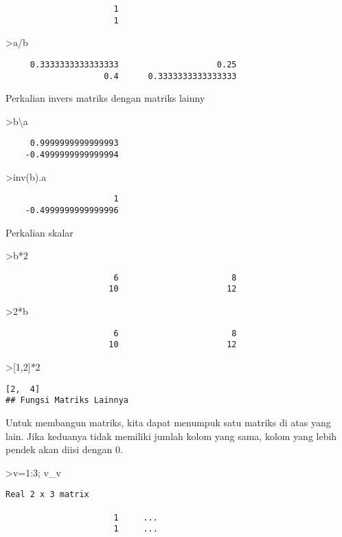 \documentclass[
]{book}
\begin{document}
\begin{verbatim}
                      1 
                      1 
\end{verbatim}

\textgreater a/b

\begin{verbatim}
     0.3333333333333333                    0.25 
                    0.4      0.3333333333333333 
\end{verbatim}

Perkalian invers matriks dengan matriks lainny

\textgreater b\textbackslash a

\begin{verbatim}
     0.9999999999999993 
    -0.4999999999999994 
\end{verbatim}

\textgreater inv(b).a

\begin{verbatim}
                      1 
    -0.4999999999999996 
\end{verbatim}

Perkalian skalar

\textgreater b*2

\begin{verbatim}
                      6                       8 
                     10                      12 
\end{verbatim}

\textgreater2*b

\begin{verbatim}
                      6                       8 
                     10                      12 
\end{verbatim}

\textgreater{[}1,2{]}*2

\begin{verbatim}
[2,  4]
## Fungsi Matriks Lainnya
\end{verbatim}

Untuk membangun matriks, kita dapat menumpuk satu matriks di atas yang lain. Jika keduanya tidak memiliki jumlah kolom yang sama, kolom yang lebih pendek akan diisi dengan 0.

\textgreater v=1:3; v\_v

\begin{verbatim}
Real 2 x 3 matrix

                      1     ...
                      1     ...
\end{verbatim}
\end{document}
